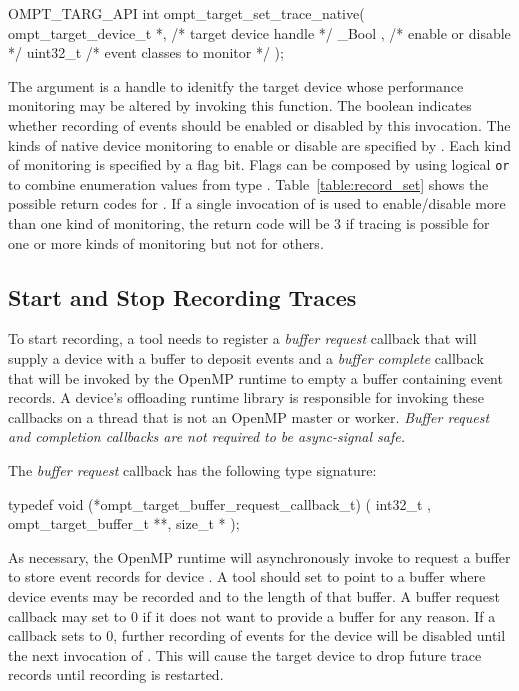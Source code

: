 \documentclass{article}
\begin{document}
\begin{boxedcode}
OMPT\_TARG\_API int ompt\_target\_set\_trace\_native(
  ompt\_target\_device\_t *,                     /* target device handle       */
  \_Bool ,                                     /* enable or disable          */
  uint32\_t                                     /* event classes to monitor   */
);
\end{boxedcode}
The argument  is a handle to idenitfy the target device whose performance monitoring may be altered by invoking this function. 
The boolean  indicates whether recording of events should be enabled or disabled by this invocation.
The kinds of native device monitoring to enable or disable are specified by . Each kind of monitoring is specified by a flag bit. Flags can be composed by using logical {\tt or}  to combine enumeration values from type .
Table~\ref{table:record_set} shows the possible return codes for .
If a single invocation of  is used to enable/disable more than one kind of monitoring, 
the return code will be 3 if tracing is possible for one or more kinds of monitoring but not for others.

\subsection{Start and Stop Recording Traces}
\label{sec:start-stop-recording}

To start recording, a tool needs to register a \emph{buffer request} callback that will supply a device with a buffer to deposit events and a \emph{buffer complete} callback that will be invoked by the OpenMP runtime to empty a buffer containing event records. A device's offloading runtime library is responsible for invoking these callbacks on a thread that is not an OpenMP master or worker. {\em Buffer request and completion callbacks are not required to  be async-signal safe.}

The \emph{buffer request} callback has the following type signature:
\begin{boxedcode}
typedef void (*ompt\_target\_buffer\_request\_callback\_t) (
  int32\_t ,
  ompt\_target\_buffer\_t **,
  size\_t *
);
\end{boxedcode}
As necessary, the OpenMP runtime will asynchronously invoke  to request a buffer to store event records for device .
A tool should set  to point to a buffer where device events may be recorded and  to the length of that buffer.
A buffer request callback  may set  to 0 if it does not want to provide a buffer for any reason. If a callback sets  to 0, further recording of events for the device will be disabled until the next invocation of . This will cause the target device to drop future trace records until recording is restarted.
\end{document}
